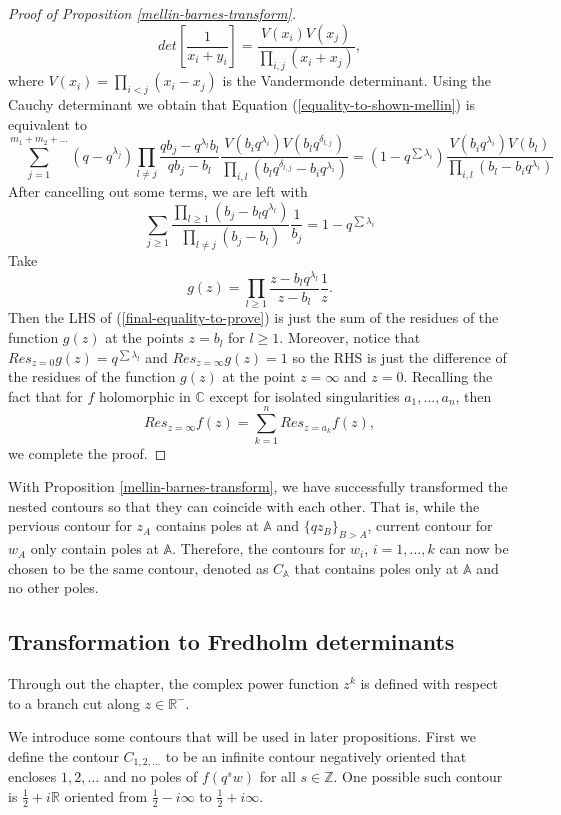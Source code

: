 \begin{proof}[Proof of Proposition \ref{mellin-barnes-transform}]
$$det\left[ \frac{1}{x_i + y_i} \right] = \frac{V(x_i) V(x_j)}{\prod_{i,j} (x_i + x_j)},$$ where $V(x_i) = \prod_{i<j} (x_i - x_j)$ is the Vandermonde determinant. Using the Cauchy determinant we obtain that Equation (\ref{equality-to-shown-mellin}) is equivalent to
$$ \sum_{j=1}^{m_1 + m_2 + \dots} (q - q^{\lambda_j}) \prod_{l \neq j} \frac{qb_j - q^{\lambda_l} b_l}{qb_j - b_l} \frac{V(b_i q^{\lambda_i}) V(b_l q^{\delta_{l,j}})}{\prod_{i,l} (b_l q^{\delta_{l,j}} - b_i q^{\lambda_i})} = (1-q^{ \sum \lambda_i }) \frac{V(b_i q^{\lambda_i}) V(b_l)}{\prod_{i,l} (b_l - b_i q^{\lambda_i})}$$
After cancelling out some terms, we are left with 
\begin{equation}
\label{final-equality-to-prove}
\sum_{j \ge 1} \frac{\prod_{l \ge 1} (b_j - b_l q^{\lambda_l})}{\prod_{l \neq j} (b_j - b_l)} \frac{1}{b_j} = 1 - q^{\sum \lambda_i}
\end{equation}
Take $$g(z) = \prod_{l \ge 1} \frac{z - b_l q^{\lambda_l}}{z - b_l} \frac{1}{z}.$$ Then the LHS of (\ref{final-equality-to-prove}) is just the sum of the residues of the function $g(z)$ at the points $z = b_l$ for $l \ge 1$. Moreover, notice that $Res_{z = 0} g(z) = q^{\sum \lambda_l}$ and $Res_{z = \infty} g(z) = 1$ so the RHS is just the difference of the residues of the function $g(z)$ at the point $z = \infty$ and $z = 0$. Recalling the fact that for $f$ holomorphic in $\mathbb{C}$ except for isolated singularities $a_1, \dots, a_n$, then $$Res_{z = \infty} f(z) = \sum_{k = 1}^{n} Res_{z = a_k} f(z),$$ we complete the proof.
\end{proof}

With Proposition \ref{mellin-barnes-transform}, we have successfully transformed the nested contours so that they can coincide with each other. That is, while the pervious contour for $z_A$ contains poles at $\mathbb{A}$ and $\{qz_B\}_{B>A}$, current contour for $w_A$ only contain poles at $\mathbb{A}$. Therefore, the contours for $w_i$, $i = 1, \dots, k$ can now be chosen to be the same contour, denoted as $C_{\mathbb{A}}$ that contains poles only at $\mathbb{A}$ and no other poles. 

\subsection{Transformation to Fredholm determinants}
\label{transformation-to-fd}
Through out the chapter, the complex power function $z^k$ is defined with respect to a branch cut along $z \in \mathbb{R}^-$.

We introduce some contours that will be used in later propositions. First we define the contour $C_{1,2,\dots}$ to be an infinite contour negatively oriented that encloses $1,2,\dots$ and no poles of $f(q^sw)$ for all $s \in \mathbb{Z}$. One possible such contour is $\frac{1}{2} + i\mathbb{R}$ oriented from $\frac{1}{2} - i\infty$ to $\frac{1}{2} + i\infty$. 

